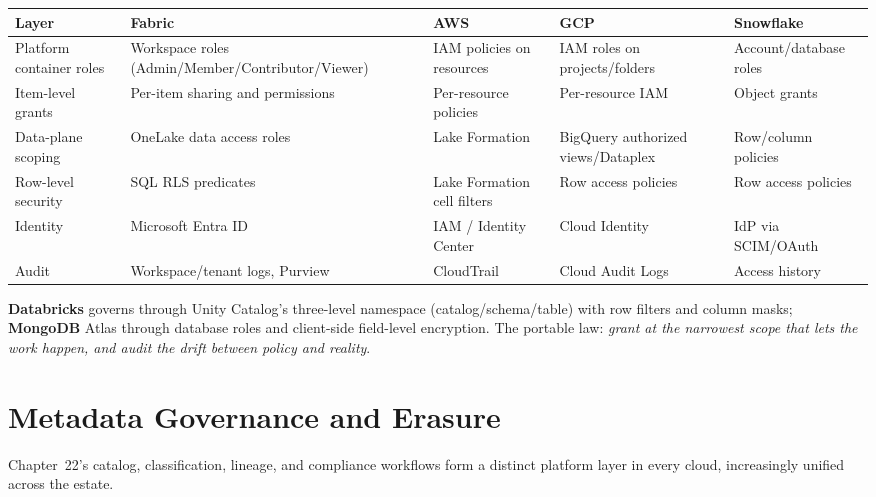 \begin{center}
\footnotesize
\begin{tabular}{@{}p{2.8cm}p{3.2cm}p{3.2cm}p{3.2cm}p{3.2cm}@{}}
\toprule
\textbf{Layer} & \textbf{Fabric} & \textbf{AWS} & \textbf{GCP} & \textbf{Snowflake} \\
\midrule
Platform container roles & Workspace roles (Admin/Member/Contributor/Viewer) & IAM policies on resources & IAM roles on projects/folders & Account/database roles \\
Item-level grants & Per-item sharing and permissions & Per-resource policies & Per-resource IAM & Object grants \\
Data-plane scoping & OneLake data access roles & Lake Formation & BigQuery authorized views/Dataplex & Row/column policies \\
Row-level security & SQL RLS predicates & Lake Formation cell filters & Row access policies & Row access policies \\
Identity & Microsoft Entra ID & IAM / Identity Center & Cloud Identity & IdP via SCIM/OAuth \\
Audit & Workspace/tenant logs, Purview & CloudTrail & Cloud Audit Logs & Access history \\
\bottomrule
\end{tabular}
\end{center}

\noindent \textbf{Databricks} governs through Unity Catalog's three-level namespace
(catalog/schema/table) with row filters and column masks; \textbf{MongoDB} Atlas through
database roles and client-side field-level encryption. The portable law: \emph{grant at the
narrowest scope that lets the work happen, and audit the drift between policy and reality}.

\section{Metadata Governance and Erasure}
%
Chapter~22's catalog, classification, lineage, and compliance workflows form a distinct
platform layer in every cloud, increasingly unified across the estate.


